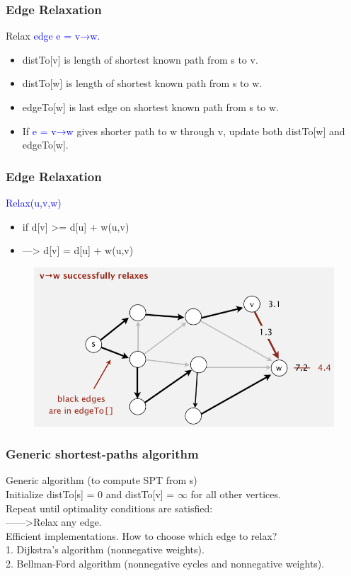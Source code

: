 \documentclass[11pt]{beamer}
\begin{document}
\begin{frame}
	\frametitle	{Edge Relaxation} 
	Relax \textcolor{blue}{edge e = v→w.}
	\begin{itemize}	
		\item distTo[v] is length of shortest \alert{known} path from s to v. 
		\item distTo[w] is length of shortest \alert{known} path from s to w. 
		\item edgeTo[w] is last edge on shortest \alert{known} path from s to w. 
		\item If \textcolor{blue}{e = v→w} gives shorter path to w through v,
		update both distTo[w] and edgeTo[w].
	\end{itemize}
  
\end{frame}

\begin{frame}
	\frametitle	{Edge Relaxation} 
	\textcolor{blue}{Relax(u,v,w)}
	\begin{itemize}	
		\item if d[v] >= d[u] + w(u,v)\\
		\item	--->	d[v] = d[u] + w(u,v)
	\end{itemize}
	\begin{figure}
		\centering
		\includegraphics[width=0.85\linewidth]{"Screenshot 2020-12-06 at 7.33.48 PM"}
		\label{fig:screenshot-2020-12-06-at-7}
	\end{figure}   
\end{frame}

\begin{frame}
	\frametitle	{Generic shortest-paths algorithm} 
    \alert{Generic algorithm (to compute SPT from s)}\\
    Initialize distTo[s] = 0 and distTo[v] = $ \infty$ for all other vertices.\\
    Repeat until optimality conditions are satisfied:\\
    ------>Relax any edge.\\
    \alert{Efficient implementations.} How to choose which edge to relax? 
    \\ 1. Dijkstra's algorithm (nonnegative weights).
    \\ 2. Bellman-Ford algorithm (nonnegative cycles and nonnegative weights).        
\end{frame}
\end{document}
